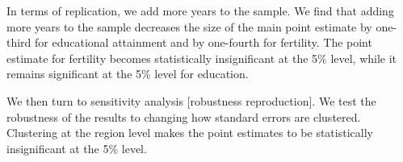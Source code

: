 \documentclass[12pt,a4paper]{article}
\begin{document}
\begin{spacing}{1.5}
In terms of replication, we add more years to the sample. We find that adding more years to the sample decreases the size of the main point estimate by one-third for educational attainment and by one-fourth for fertility. The point estimate for fertility becomes statistically insignificant at the 5\% level, while it remains significant at the 5\% level for education. 

We then turn to sensitivity analysis [robustness reproduction]. We test the robustness of the results to changing how standard errors are clustered. Clustering at the region level makes the point estimates to be statistically insignificant at the 5\% level.
\end{spacing}

%

\end{document}
